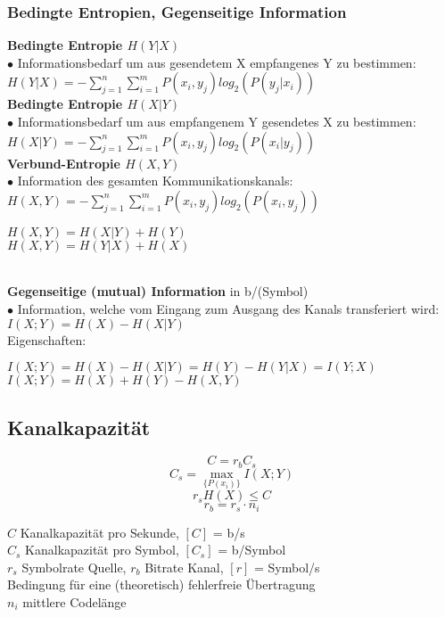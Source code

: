 \subsubsection{Bedingte Entropien, Gegenseitige Information}
	\textbf{Bedingte Entropie $H(Y|X)$}\\
	$\bullet$ Informationsbedarf um aus gesendetem X empfangenes Y zu bestimmen: $H(Y|X)	=- \sum\limits_{j=1}^{n} \sum\limits_{i=1}^{m} P(x_i,y_j) log_2(P(y_j|x_i))$ \\
	\textbf{Bedingte Entropie $H(X|Y)$}\\
	$\bullet$ Informationsbedarf um aus empfangenem Y gesendetes X zu bestimmen: $H(X|Y)	=- \sum\limits_{j=1}^{n} \sum\limits_{i=1}^{m} P(x_i,y_j) log_2(P(x_i|y_j))$ \\
	\textbf{Verbund-Entropie $H(X,Y)$} \\
	$\bullet$ Information des gesamten Kommunikationskanals:  $H(X,Y)	=- \sum\limits_{j=1}^{n} \sum\limits_{i=1}^{m} P(x_i,y_j) log_2(P(x_i,y_j))$ \qquad \parbox{6cm}{
		$H(X,Y) = H(X|Y) + H(Y)$ \\
		$H(X,Y) = H(Y|X) + H(X)$
	} \\
	\textbf{Gegenseitige (mutual) Information} in b/(Symbol)\\
	$\bullet$ Information, welche vom Eingang zum Ausgang des Kanals transferiert wird: $I(X;Y) = H(X)-H(X|Y)$\\
	\hspace*{0.5cm} Eigenschaften: \quad \parbox{12cm}{
	$I(X;Y) = H(X)-H(X|Y) = H(Y)-H(Y|X) = I(Y;X)$ \\
	$I(X;Y) = H(X)+H(Y)-H(X,Y)$}

\subsection{Kanalkapazität }
\begin{minipage}[c]{8cm}
	$$ C = r_b C_s $$
	$$ C_s = \max\limits_{\{ P(x_i) \}}{I (X; Y)} $$
	$$ r_s H(X) \leq C$$
	$$ r_b = r_s \cdot n_i$$
\end{minipage}
\begin{minipage}[c]{10cm}
	$C$ Kanalkapazität pro Sekunde, $[C]$ = b/s \\
	$C_s$ Kanalkapazität pro Symbol, $[C_s]$ = b/Symbol \\
	$r_s$ Symbolrate Quelle, $r_b$ Bitrate Kanal, $[r]$ = Symbol/s \\
	Bedingung für eine (theoretisch) fehlerfreie Übertragung \\
	$n_i$ mittlere Codelänge
\end{minipage}

